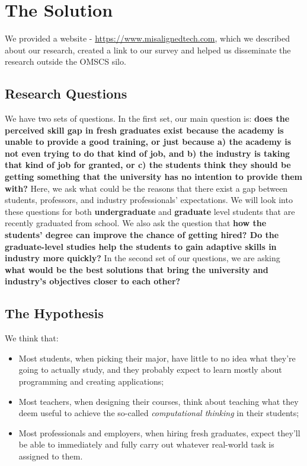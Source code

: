 \documentclass{sigchi}
\begin{document}
\section{The Solution}
We provided a website - \url{https://www.misalignedtech.com}, which we described about our research, created a link to our survey and helped us disseminate the research outside the OMSCS silo.

\subsection{Research Questions}
We have two sets of questions. In the first set, our main question is: \textbf{does the perceived skill gap in fresh graduates exist because the academy is unable to provide a good training, or just because a) the academy is not even trying to do that kind of job, and b) the industry is taking that kind of job for granted, or c) the students think they should be getting something that the university has no intention to provide them with?} Here, we ask what could be the reasons that there exist a gap between students, professors, and industry professionals' expectations. We will look into these questions for both \textbf{undergraduate} and \textbf{graduate} level students that are recently graduated from school. We also ask the question that \textbf{how the students' degree can improve the chance of getting hired? Do the graduate-level studies help the students to gain adaptive skills in industry more quickly?}\newline
In the second set of our questions, we are asking \textbf{what would be the best solutions that bring the university and industry's objectives closer to each other?} 

\subsection{The Hypothesis}
We think that:
\begin{itemize}
\item Most students, when picking their major, have little to no idea what they're going to actually study, and they probably expect to learn mostly about programming and creating applications;
\item Most teachers, when designing their courses, think about teaching what they deem useful to achieve the so-called \textit{computational thinking} in their students;
\item Most professionals and employers, when hiring fresh graduates, expect they'll be able to immediately and fully carry out whatever real-world task is assigned to them.
\end{itemize}
\end{document}
